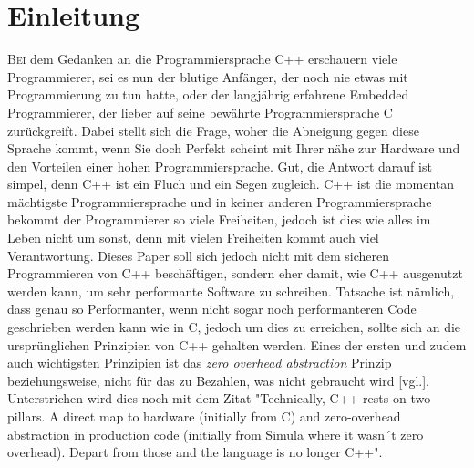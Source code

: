 \section{Einleitung}
\lettrine{B}{ei} dem Gedanken an die Programmiersprache C++ erschauern viele Programmierer, sei
es nun der blutige Anfänger, der noch nie etwas mit Programmierung zu tun hatte, oder der
langjährig erfahrene Embedded Programmierer, der lieber auf seine bewährte Programmiersprache C
zurückgreift. Dabei stellt sich die Frage, woher die Abneigung gegen diese Sprache kommt, wenn
Sie doch Perfekt scheint mit Ihrer nähe zur Hardware und den Vorteilen einer hohen
Programmiersprache. Gut, die Antwort darauf ist simpel, denn C++ ist ein Fluch und ein Segen
zugleich. C++ ist die momentan mächtigste Programmiersprache und in keiner anderen
Programmiersprache bekommt der Programmierer so viele Freiheiten, jedoch ist dies wie alles im
Leben nicht um sonst, denn mit vielen Freiheiten kommt auch viel Verantwortung.
\newline
\newline
Dieses Paper soll sich jedoch nicht mit dem sicheren Programmieren von C++ beschäftigen, sondern
eher damit, wie C++ ausgenutzt werden kann, um sehr performante Software zu schreiben. Tatsache
ist nämlich, dass genau so Performanter, wenn nicht sogar noch performanteren Code geschrieben
werden kann wie in C, jedoch um dies zu erreichen, sollte sich an die ursprünglichen Prinzipien
von C++ gehalten werden. Eines der ersten und zudem auch wichtigsten Prinzipien ist das
\emph{zero overhead abstraction} Prinzip beziehungsweise, nicht für das zu Bezahlen, was nicht
gebraucht wird \cite{HandsOn}[vgl.]. Unterstrichen wird dies noch mit dem Zitat  "Technically,
C++ rests on two pillars. A direct map to hardware (initially from C) and zero-overhead
abstraction in production code (initially from Simula where it wasn´t zero overhead). Depart from
those and the language is no longer C++"\cite{ISOC++}.
		
		
